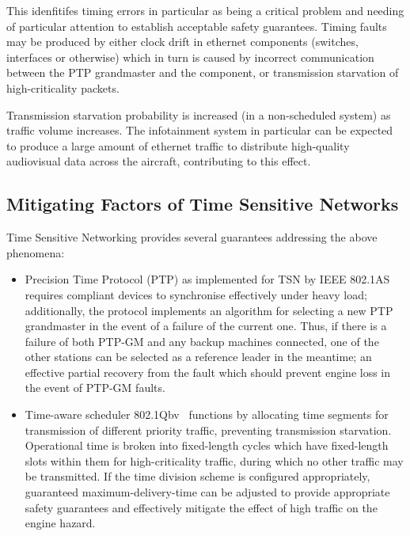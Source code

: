 This idenfitifes timing errors in particular as being a critical problem and needing of particular attention to establish acceptable safety guarantees.
Timing faults may be produced by either clock drift in ethernet components (switches, interfaces or otherwise) which in turn is caused by incorrect communication between the PTP grandmaster and the component, or transmission starvation of high-criticality packets.

Transmission starvation probability is increased (in a non-scheduled system) as traffic volume increases.
The infotainment system in particular can be expected to produce a large amount of ethernet traffic to distribute high-quality audiovisual data across the aircraft, contributing to this effect.

\subsection{Mitigating Factors of Time Sensitive Networks}

Time Sensitive Networking provides several guarantees addressing the above phenomena:

\begin{itemize}
    \item Precision Time Protocol (PTP) as implemented for TSN by IEEE 802.1AS~\cite{IEEEStandardLocal2020} requires compliant devices to synchronise effectively under heavy load; additionally, the protocol implements an algorithm for selecting a new PTP grandmaster in the event of a failure of the current one.
    Thus, if there is a failure of both PTP-GM and any backup machines connected, one of the other stations can be selected as a reference leader in the meantime; an effective partial recovery from the fault which should prevent engine loss in the event of PTP-GM faults.
    \item Time-aware scheduler 802.1Qbv~\cite{IEEEStandardLocal2016a} functions by allocating time segments for transmission of different priority traffic, preventing transmission starvation.
    Operational time is broken into fixed-length cycles which have fixed-length slots within them for high-criticality traffic, during which no other traffic may be transmitted.
    If the time division scheme is configured appropriately, guaranteed maximum-delivery-time can be adjusted to provide appropriate safety guarantees and effectively mitigate the effect of high traffic on the engine hazard.
\end{itemize}

